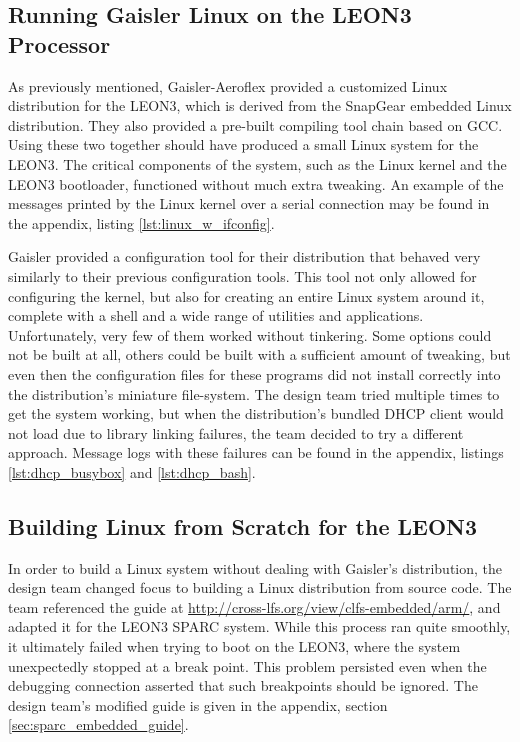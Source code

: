 \subsection{Running Gaisler Linux on the LEON3 Processor}
As previously mentioned, Gaisler-Aeroflex provided a customized Linux
distribution for the LEON3, which is derived from the SnapGear embedded
Linux distribution. They also provided a pre-built compiling tool chain
based on \ac{GCC}. Using these two together should have produced a small
Linux system for the LEON3. The critical components of the system, such as
the Linux kernel and the LEON3 bootloader, functioned without much extra
tweaking. An example of the messages printed by the Linux kernel over a
serial connection may be found in the appendix, listing
\ref{lst:linux_w_ifconfig}.

Gaisler provided a configuration tool for their distribution that behaved
very similarly to their previous configuration tools. This tool not only
allowed for configuring the kernel, but also for creating an entire Linux
system around it, complete with a shell and a wide range of utilities and
applications. Unfortunately, very few of them worked without
tinkering. Some options could not be built at all, others could be built
with a sufficient amount of tweaking, but even then the configuration files
for these programs did not install correctly into the distribution's
miniature file-system. The design team tried multiple times to get the
system working, but when the distribution's bundled \ac{DHCP} client would
not load due to library linking failures, the team decided to try a
different approach. Message logs with these failures can be found in the
appendix, listings \ref{lst:dhcp_busybox} and \ref{lst:dhcp_bash}.

\subsection{Building Linux from Scratch for the LEON3}
In order to build a Linux system without dealing with Gaisler's
distribution, the design team changed focus to building a Linux
distribution from source code. The team referenced the guide at
\url{http://cross-lfs.org/view/clfs-embedded/arm/}, and adapted it for the
LEON3 SPARC system. While this process ran quite smoothly, it ultimately
failed when trying to boot on the LEON3, where the system unexpectedly
stopped at a break point. This problem persisted even when the debugging
connection asserted that such breakpoints should be ignored. The design
team's modified guide is given in the appendix, section
\ref{sec:sparc_embedded_guide}.

